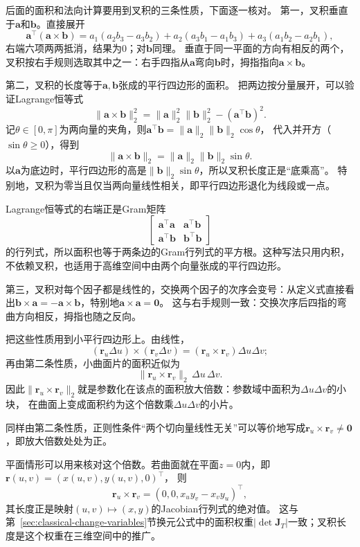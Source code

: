 后面的面积和法向计算要用到叉积的三条性质，下面逐一核对。
第一，叉积垂直于$\bm a$和$\bm b$。直接展开
\[
 \bm a^\top(\bm a\times\bm b)
 =a_1(a_2b_3-a_3b_2)+a_2(a_3b_1-a_1b_3)+a_3(a_1b_2-a_2b_1),
\]
右端六项两两抵消，结果为$0$；对$\bm b$同理。
垂直于同一平面的方向有相反的两个，叉积按右手规则选取其中之一：右手四指从$\bm a$弯向$\bm b$时，拇指指向$\bm a\times\bm b$。

第二，叉积的长度等于$\bm a,\bm b$张成的平行四边形的面积。
把两边按分量展开，可以验证Lagrange恒等式
\[
 \lVert\bm a\times\bm b\rVert_2^2
 =\lVert\bm a\rVert_2^2\lVert\bm b\rVert_2^2-(\bm a^\top\bm b)^2.
\]
记$\theta\in[0,\pi]$为两向量的夹角，则$\bm a^\top\bm b=\lVert\bm a\rVert_2\lVert\bm b\rVert_2\cos\theta$，
代入并开方（$\sin\theta\geq0$），得到
\[
 \lVert\bm a\times\bm b\rVert_2=\lVert\bm a\rVert_2\lVert\bm b\rVert_2\sin\theta.
\]
以$\bm a$为底边时，平行四边形的高是$\lVert\bm b\rVert_2\sin\theta$，所以叉积长度正是“底乘高”。
特别地，叉积为零当且仅当两向量线性相关，即平行四边形退化为线段或一点。

Lagrange恒等式的右端正是Gram矩阵
\[
 \begin{bmatrix}\bm a^\top\bm a&\bm a^\top\bm b\\\bm a^\top\bm b&\bm b^\top\bm b\end{bmatrix}
\]
的行列式，所以面积也等于两条边的Gram行列式的平方根。这种写法只用内积，不依赖叉积，也适用于高维空间中由两个向量张成的平行四边形。

第三，叉积对每个因子都是线性的，交换两个因子的次序会变号：从定义式直接看出$\bm b\times\bm a=-\bm a\times\bm b$，特别地$\bm a\times\bm a=\bm0$。
这与右手规则一致：交换次序后四指的弯曲方向相反，拇指也随之反向。

把这些性质用到小平行四边形上。由线性，
\[
 (\bm r_u\Delta u)\times(\bm r_v\Delta v)=(\bm r_u\times\bm r_v)\Delta u\Delta v;
\]
再由第二条性质，小曲面片的面积近似为
\[
 \lVert\bm r_u\times\bm r_v\rVert_2\,\Delta u\,\Delta v.
\]
因此$\lVert\bm r_u\times\bm r_v\rVert_2$就是参数化在该点的面积放大倍数：参数域中面积为$\Delta u\Delta v$的小块，
在曲面上变成面积约为这个倍数乘$\Delta u\Delta v$的小片。

同样由第二条性质，正则性条件“两个切向量线性无关”可以等价地写成$\bm r_u\times\bm r_v\ne\bm0$，即放大倍数处处为正。

平面情形可以用来核对这个倍数。若曲面就在平面$z=0$内，即$\bm r(u,v)=(x(u,v),y(u,v),0)^\top$，
则
\[
 \bm r_u\times\bm r_v=(0,0,x_uy_v-x_vy_u)^\top,
\]
其长度正是映射$(u,v)\mapsto(x,y)$的Jacobian行列式的绝对值。
这与第~\ref{sec:classical-change-variables}节换元公式中的面积权重$|\det\bm J_T|$一致；叉积长度是这个权重在三维空间中的推广。

